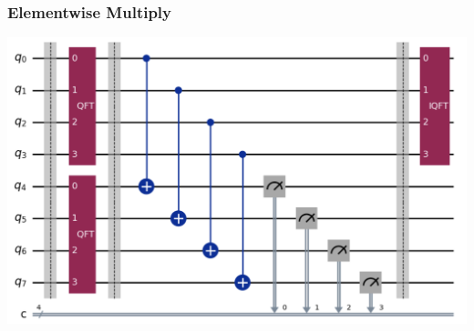 \documentclass[
	11pt, %
]{beamer}
\begin{document}

\begin{frame}
    \frametitle{Elementwise Multiply}
    \begin{center}
        \includegraphics[scale=0.28]{elementwise.png}
    \end{center}
\end{frame}


\end{document}
